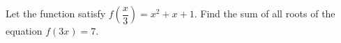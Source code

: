 Let the function satisfy $f\left(\dfrac{x}{3}\right)=x^{2}+x+1$. Find the sum of all roots of the equation $f(3x)=7$.
